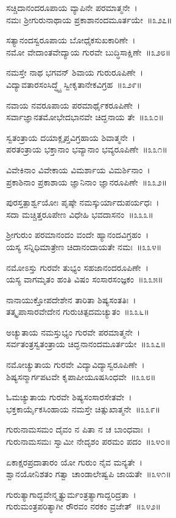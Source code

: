 ಸಚ್ಚಿದಾನಂದರೂಪಾಯ ವ್ಯಾಪಿನೇ ಪರಮಾತ್ಮನೇ~।\\
ನಮಃ ಶ್ರೀಗುರುನಾಥಾಯ ಪ್ರಕಾಶಾನಂದಮೂರ್ತಯೇ~॥೩೨೭॥

ಸತ್ಯಾನಂದಸ್ವರೂಪಾಯ ಬೋಧೈಕಸುಖಕಾರಿಣೇ~।\\
ನಮೋ ವೇದಾಂತವೇದ್ಯಾಯ ಗುರವೇ ಬುದ್ಧಿಸಾಕ್ಷಿಣೇ~॥೩೨೮॥

ನಮಸ್ತೇ ನಾಥ ಭಗವನ್ ಶಿವಾಯ ಗುರುರೂಪಿಣೇ~।\\
ವಿದ್ಯಾವತಾರಸಂಸಿದ್ಧ್ಯೈ ಸ್ವೀಕೃತಾನೇಕವಿಗ್ರಹ~॥೩೨೯॥

ನವಾಯ ನವರೂಪಾಯ ಪರಮಾರ್ಥೈಕರೂಪಿಣೇ~।\\
ಸರ್ವಾಜ್ಞಾನತಮೋಭೇದಭಾನವೇ ಚಿದ್ಘನಾಯ ತೇ~॥೩೩೦॥

ಸ್ವತಂತ್ರಾಯ ದಯಾಕ್ಲೃಪ್ತವಿಗ್ರಹಾಯ ಶಿವಾತ್ಮನೇ~।\\
ಪರತಂತ್ರಾಯ ಭಕ್ತಾನಾಂ ಭವ್ಯಾನಾಂ ಭವ್ಯರೂಪಿಣೇ~॥೩೩೧॥

ವಿವೇಕಿನಾಂ ವಿವೇಕಾಯ ವಿಮರ್ಶಾಯ ವಿಮರ್ಶಿನಾಂ~।\\
ಪ್ರಕಾಶಿನಾಂ ಪ್ರಕಾಶಾಯ ಜ್ಞಾನಿನಾಂ ಜ್ಞಾನರೂಪಿಣೇ~॥೩೩೨॥

ಪುರಸ್ತತ್ಪಾರ್ಶ್ವಯೋಃ ಪೃಷ್ಠೇ ನಮಸ್ಕುರ್ಯಾದುಪರ್ಯಧಃ~।\\
ಸದಾ ಮಚ್ಚಿತ್ತರೂಪೇಣ ವಿಧೇಹಿ ಭವದಾಸನಂ~॥೩೩೩॥

ಶ್ರೀಗುರುಂ ಪರಮಾನಂದಂ ವಂದೇ ಹ್ಯಾನಂದವಿಗ್ರಹಂ~।\\
ಯಸ್ಯ ಸನ್ನಿಧಿಮಾತ್ರೇಣ ಚಿದಾನಂದಾಯತೇ ನಮಃ~॥೩೩೪॥

ನಮೋಽಸ್ತು ಗುರವೇ ತುಭ್ಯಂ ಸಹಜಾನಂದರೂಪಿಣೇ~।\\
ಯಸ್ಯ ವಾಗಮೃತಂ ಹಂತಿ ವಿಷಂ ಸಂಸಾರಸಂಜ್ಞಕಂ~॥೩೩೫॥

ನಾನಾಯುಕ್ತೋಪದೇಶೇನ ತಾರಿತಾ ಶಿಷ್ಯಸಂತತಿಃ~।\\
ತತ್ಕೃಪಾಸಾರವೇದೇನ ಗುರುಚಿತ್ಪದಮಚ್ಯುತಂ~॥೩೩೬॥

ಅಚ್ಯುತಾಯ ನಮಸ್ತುಭ್ಯಂ ಗುರವೇ ಪರಮಾತ್ಮನೇ~।\\
ಸರ್ವತಂತ್ರಸ್ವತಂತ್ರಾಯ ಚಿದ್ಘನಾನಂದಮೂರ್ತಯೇ~॥೩೩೭॥

ನಮೋಚ್ಯುತಾಯ ಗುರವೇ ವಿದ್ಯಾವಿದ್ಯಾಸ್ವರೂಪಿಣೇ~।\\
ಶಿಷ್ಯಸನ್ಮಾರ್ಗಪಟವೇ ಕೃಪಾಪೀಯೂಷಸಿಂಧವೇ~॥೩೩೮॥

ಓಮಚ್ಯುತಾಯ ಗುರವೇ ಶಿಷ್ಯಸಂಸಾರಸೇತವೇ~।\\
ಭಕ್ತಕಾರ್ಯೈಕಸಿಂಹಾಯ ನಮಸ್ತೇ ಚಿತ್ಸುಖಾತ್ಮನೇ~॥೩೩೯॥

ಗುರುನಾಮಸಮಂ ದೈವಂ ನ ಪಿತಾ ನ ಚ ಬಾಂಧವಾಃ~।\\
ಗುರುನಾಮಸಮಃ ಸ್ವಾಮೀ ನೇದೃಶಂ ಪರಮಂ ಪದಂ~॥೩೪೦॥

ಏಕಾಕ್ಷರಪ್ರದಾತಾರಂ ಯೋ ಗುರುಂ ನೈವ ಮನ್ಯತೇ~।\\
ಶ್ವಾನಯೋನಿಶತಂ ಗತ್ವಾ ಚಾಂಡಾಲೇಷ್ವಪಿ ಜಾಯತೇ~॥೩೪೧॥

ಗುರುತ್ಯಾಗಾದ್ಭವೇನ್ಮೃತ್ಯುರ್ಮಂತ್ರತ್ಯಾಗಾದ್ದರಿದ್ರತಾ~।\\
ಗುರುಮಂತ್ರಪರಿತ್ಯಾಗೀ ರೌರವಂ ನರಕಂ ವ್ರಜೇತ್~॥೩೪೨॥

